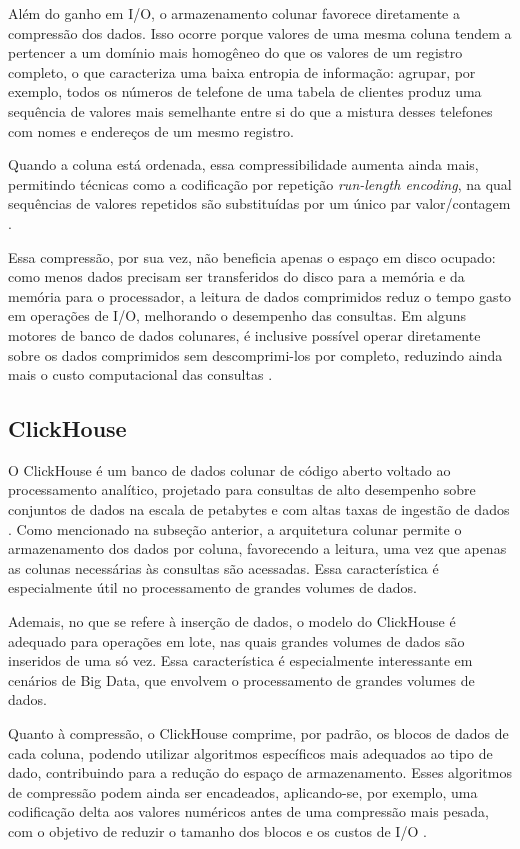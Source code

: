Além do ganho em I/O, o armazenamento colunar favorece diretamente a compressão dos
dados. Isso ocorre porque valores de uma mesma coluna tendem a pertencer a um domínio
mais homogêneo do que os valores de um registro completo, o que caracteriza uma baixa
entropia de informação: agrupar, por exemplo, todos os números de telefone de uma
tabela de clientes produz uma sequência de valores mais semelhante entre si do que a
mistura desses telefones com nomes e endereços de um mesmo registro.

Quando a coluna está ordenada, essa compressibilidade aumenta ainda mais, permitindo técnicas 
como a codificação por repetição \textit{run-length encoding}, na qual sequências de valores
repetidos são substituídas por um único par valor/contagem \cite{abadi2008column}.

Essa compressão, por sua vez, não beneficia apenas o espaço em disco ocupado: como
menos dados precisam ser transferidos do disco para a memória e da memória para o
processador, a leitura de dados comprimidos reduz o tempo gasto em operações de I/O,
melhorando o desempenho das consultas. Em alguns motores de banco de dados colunares,
é inclusive possível operar diretamente sobre os dados comprimidos sem descomprimi-los
por completo, reduzindo ainda mais o custo computacional das consultas
\cite{abadi2008column}.

\subsection{ClickHouse}

O ClickHouse é um banco de dados colunar de código aberto voltado ao processamento
analítico, projetado para consultas de alto desempenho sobre conjuntos de dados
na escala de petabytes e com altas taxas de ingestão de dados \cite{schulze2024clickhouse}.
Como mencionado na subseção anterior, a arquitetura colunar permite o armazenamento dos dados 
por coluna, favorecendo a leitura, uma vez que apenas as colunas necessárias às consultas são 
acessadas. Essa característica é especialmente útil no processamento de grandes volumes de dados.

Ademais, no que se refere à inserção de dados, o modelo do ClickHouse é adequado para 
operações em lote, nas quais grandes volumes de dados são inseridos de uma só vez. 
Essa característica é especialmente interessante em cenários de Big Data, que envolvem o 
processamento de grandes volumes de dados. 

Quanto à compressão, o ClickHouse comprime, por padrão, os blocos de dados de cada coluna, 
podendo utilizar algoritmos específicos mais adequados ao tipo de dado, contribuindo para a 
redução do espaço de armazenamento. Esses algoritmos de compressão podem ainda ser encadeados, 
aplicando-se, por exemplo, uma codificação delta aos valores numéricos antes de uma compressão 
mais pesada, com o objetivo de reduzir o tamanho dos blocos e os custos de I/O 
\cite{schulze2024clickhouse}. 

